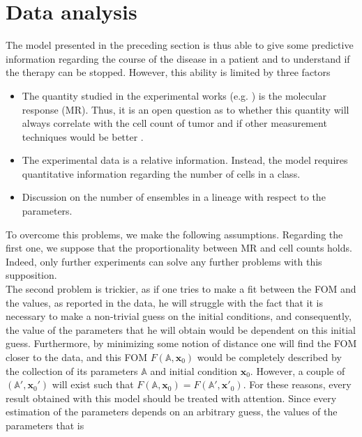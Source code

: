 \documentclass[a4paper,10pt]{article}
\begin{document}
\FloatBarrier

\section{Data analysis}
The model presented in the preceding section is thus able to give some predictive 
information regarding the course of the disease in a patient and to 
understand if the therapy can be stopped.
However, this ability is limited by three factors 
\begin{itemize}
\item The quantity studied in the experimental works (e.g. \cite{michor2005, olshen2014dynamics}) 
is the molecular response (MR). 
Thus, it is an open question as to whether this quantity will always correlate with the 
cell count of tumor and if other 
measurement techniques would be better 
\cite{rainero2018gdna, experiment-affidabile-1, experiment-affidabile-2, experiment-affidabile-3,
experiment-affidabile-4, latham2016bcr}.
\item The experimental data is a relative 
information.
Instead, the model requires
quantitative information 
regarding the number of cells in a class.
\item Discussion on the number of ensembles in a lineage with respect to the parameters. 
\end{itemize}
To overcome this problems, we make the following assumptions.
Regarding the first one, we suppose that the proportionality between MR and cell counts holds.
Indeed, only further experiments can solve any further problems with this supposition.\\
The second problem is trickier, 
as if one tries to make a fit 
between the FOM and the values,
as reported in the data, he will struggle with the fact that it is necessary to make
a non-trivial guess 
on the initial conditions, 
and consequently, the value of the parameters that he will obtain would be dependent on 
this initial guess. 
Furthermore, by minimizing some notion of distance 
one will find the FOM closer to the data, and this 
FOM $F(\mathbb{A},\mathbf{x}_0)$ 
would be completely described by the collection of its parameters 
$\mathbb{A}$ and initial condition $\mathbf{x}_0$.
However, a couple of
$(\mathbb{A}',\mathbf{x}_0')$ will exist such that
$F(\mathbb{A},\mathbf{x}_0)=F(\mathbb{A}',\mathbf{x}'_0)$.
For these reasons, every result obtained with this model 
should be treated with attention. Since every estimation of the parameters
depends on an arbitrary guess, the values of the parameters that is
\end{document}
